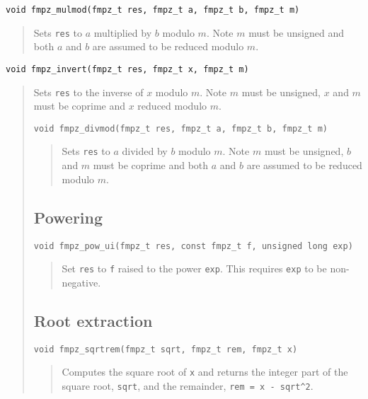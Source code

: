 \documentclass[a4paper,10pt]{article}
\newcommand{\code}{\lstinline}
\begin{document}
\begin{lstlisting}
void fmpz_mulmod(fmpz_t res, fmpz_t a, fmpz_t b, fmpz_t m) 
\end{lstlisting}
\begin{quote}
Sets \code{res} to $a$ multiplied by $b$ modulo $m$. Note $m$ must be unsigned and both $a$ and $b$ are assumed to be reduced modulo $m$.
\end{quote}

\begin{lstlisting}
void fmpz_invert(fmpz_t res, fmpz_t x, fmpz_t m) 
\end{lstlisting}
\begin{quote}
Sets \code{res} to the inverse of $x$ modulo $m$. Note $m$ must be unsigned, $x$ and $m$ must be coprime and $x$ reduced modulo $m$.

\begin{lstlisting}
void fmpz_divmod(fmpz_t res, fmpz_t a, fmpz_t b, fmpz_t m) 
\end{lstlisting}
\begin{quote}
Sets \code{res} to $a$ divided by $b$ modulo $m$. Note $m$ must be unsigned, $b$ and $m$ must be coprime and both $a$ and $b$ are assumed to be reduced modulo $m$.

\end{quote}

\subsection{Powering}

\begin{lstlisting}
void fmpz_pow_ui(fmpz_t res, const fmpz_t f, unsigned long exp)
\end{lstlisting}
\begin{quote}
Set \code{res} to \code{f} raised to the power \code{exp}. This requires \code{exp} to be non-negative.
\end{quote}

\subsection{Root extraction}

\begin{lstlisting}
void fmpz_sqrtrem(fmpz_t sqrt, fmpz_t rem, fmpz_t x)
\end{lstlisting}
\begin{quote}
Computes the square root of \code{x} and returns the integer part of the square root, \code{sqrt}, and the remainder, \code{rem = x - sqrt^2}. 


\end{quote}
\end{quote}
\end{document}
